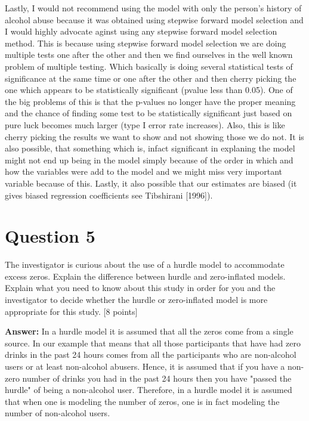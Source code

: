 \documentclass{article}\usepackage[]{graphicx}\usepackage[]{color}
\begin{document}
\vspace{5mm}

Lastly, I would not recommend using the model with only the person's history of alcohol abuse because it was obtained using stepwise forward model selection and I would highly advocate aginst using any stepwise forward model selection method. This is because using stepwise forward model selection we are doing multiple tests one after the other and then we find ourselves in the well known problem of multiple testing. Which basically is doing several statistical tests of significance at the same time or one after the other and then cherry picking the one which appears to be statistically significant (pvalue less than 0.05). One of the big problems of this is that the p-values no longer have the proper meaning and the chance of finding some test to be statistically significant just based on pure luck becomes much larger (type I error rate increases). Also, this is like cherry picking the results we want to show and not showing those we do not. It is also possible, that something which is, infact significant in explaning the model might not end up being in the model simply because of the order in which and how the variables were add to the model and we might miss very important variable because of this. Lastly, it also possible that our estimates are biased (it gives biased regression coefficients see Tibshirani [1996]).


\section*{Question 5}

The investigator is curious about the use of a hurdle model to accommodate
excess zeros. Explain the difference between hurdle and zero-inflated models.
Explain what you need to know about this study in order for you and the
investigator to decide whether the hurdle or zero-inflated model is more
appropriate for this study. [8 points]

\vspace{5mm}

{\bf Answer:}  In a hurdle model it is assumed that all the zeros come from a single source. In our example that means that all those participants that have had zero drinks in the past 24 hours comes from all the participants who are non-alcohol users or at least non-alcohol abusers. Hence, it is assumed that if you have a non-zero number of drinks you had in the past 24 hours then you have "passed the hurdle" of being a non-alcohol user. Therefore, in a hurdle model it is assumed that when one is modeling the number of zeros, one is in fact modeling the number of non-alcohol users. 
\end{document}
